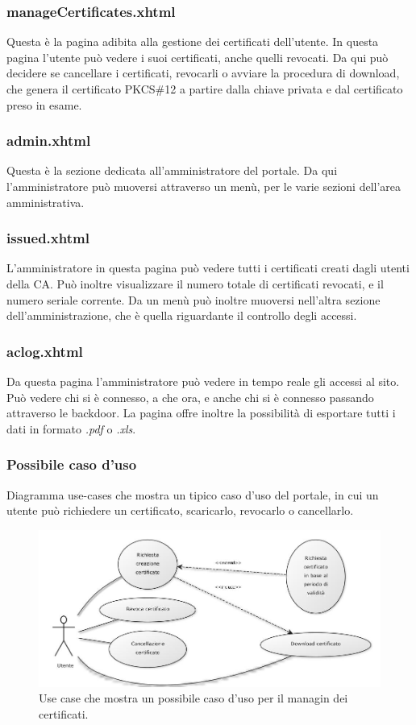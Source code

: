 \documentclass{article}
\begin{document}
\subsubsection*{manageCertificates.xhtml}
Questa è la pagina adibita alla gestione dei certificati dell'utente. In questa pagina l'utente può vedere i suoi certificati, anche quelli revocati. Da qui può decidere se cancellare i certificati, revocarli o avviare la procedura di download, che genera il certificato PKCS\#12 a partire dalla chiave privata e dal certificato preso in esame.
\subsubsection*{admin.xhtml}
Questa è la sezione dedicata all'amministratore del portale. Da qui l'amministratore può muoversi attraverso un menù, per le varie sezioni dell'area amministrativa.
\subsubsection*{issued.xhtml}
L'amministratore in questa pagina può vedere tutti i certificati creati dagli utenti della CA. Può inoltre visualizzare il numero totale di certificati revocati, e il numero seriale corrente. Da un menù può inoltre muoversi nell'altra sezione dell'amministrazione, che è quella riguardante il controllo degli accessi.
\subsubsection*{aclog.xhtml}
Da questa pagina l'amministratore può vedere in tempo reale gli accessi al sito. Può vedere chi si è connesso, a che ora, e anche chi si è connesso passando attraverso le backdoor. La pagina offre inoltre la possibilità di esportare tutti i dati in formato \emph{.pdf} o \emph{.xls}.

\subsubsection*{Possibile caso d'uso}
Diagramma use-cases che mostra un tipico caso d'uso del portale, in cui un utente può richiedere un certificato, scaricarlo, revocarlo o cancellarlo.

\begin{figure}[h!]
\centering
\centerline{\includegraphics[scale=0.35,keepaspectratio]{img/use_case_certificato}}
\caption{Use case che mostra un possibile caso d'uso per il managin dei certificati.}
\end{figure}
\end{document}
